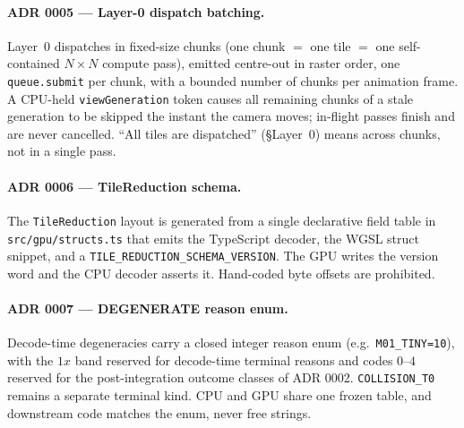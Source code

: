\documentclass[11pt]{report}
\begin{document}
\paragraph{ADR 0005 --- Layer-0 dispatch batching.} Layer~0 dispatches in
fixed-size chunks (one chunk $=$ one tile $=$ one self-contained $N\times N$
compute pass), emitted centre-out in raster order, one \texttt{queue.submit} per
chunk, with a bounded number of chunks per animation frame. A CPU-held
\texttt{viewGeneration} token causes all remaining chunks of a stale generation
to be skipped the instant the camera moves; in-flight passes finish and are
never cancelled. ``All tiles are dispatched'' (\S Layer~0) means across chunks,
not in a single pass.

\paragraph{ADR 0006 --- TileReduction schema.} The \texttt{TileReduction} layout
is generated from a single declarative field table in \texttt{src/gpu/structs.ts}
that emits the TypeScript decoder, the WGSL struct snippet, and a
\texttt{TILE\_REDUCTION\_SCHEMA\_VERSION}. The GPU writes the version word and
the CPU decoder asserts it. Hand-coded byte offsets are prohibited.

\paragraph{ADR 0007 --- DEGENERATE reason enum.} Decode-time degeneracies carry
a closed integer reason enum (e.g.\ \texttt{M01\_TINY=10}), with the $1x$ band
reserved for decode-time terminal reasons and codes $0$--$4$ reserved for the
post-integration outcome classes of ADR 0002. \texttt{COLLISION\_T0} remains a
separate terminal kind. CPU and GPU share one frozen table, and downstream code
matches the enum, never free strings.
\end{document}
